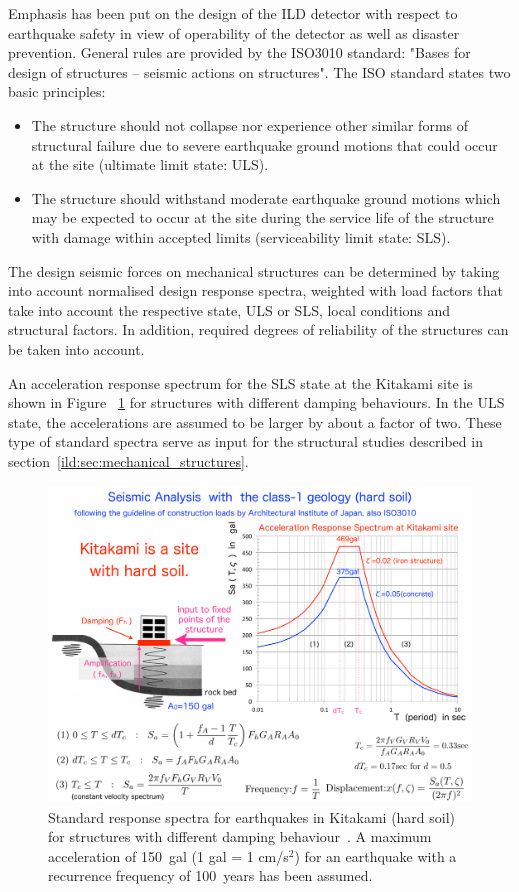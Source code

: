 Emphasis has been put on the design of the ILD detector with respect to earthquake safety in view of operability of the detector as well as disaster prevention. General rules are provided by the ISO3010 standard: "Bases for design of structures -- seismic actions on structures". The ISO standard states two basic principles:
\begin{itemize}
\item The structure should not collapse nor experience other similar forms of structural failure due to severe earthquake ground motions that could occur at the site (ultimate limit state: ULS).
\item The structure should withstand moderate earthquake ground motions which may be expected to occur at the site during the service life of the structure with damage within accepted limits (serviceability limit state: SLS).
\end{itemize}

The design seismic forces on mechanical structures can be determined by taking into account normalised design response spectra, weighted with load factors that take into account the respective state, ULS or SLS, local conditions and structural factors. In addition, required degrees of reliability of the structures can be taken into account.

An acceleration response spectrum for the SLS state at the Kitakami site is shown in Figure~ \ref{ild:fig:integration:earthquake_spectra} for structures with different damping behaviours. In the ULS state, the accelerations are assumed to be larger by about a factor of two. These type of standard spectra serve as input for the structural studies described in section~\ref{ild:sec:mechanical_structures}.
\begin{figure}[t!]
\begin{center}
\includegraphics[width=0.8\hsize]{Integration/fig/earthquake_spectra.pdf}
\end{center}
\caption{\label{ild:fig:integration:earthquake_spectra}Standard response spectra for earthquakes in Kitakami (hard soil) for structures with different damping behaviour~\cite{ild:bib:earthquake}. A maximum acceleration of 150~gal (1 gal = 1 cm/s$^2$) for an earthquake with a recurrence frequency of 100~years has been assumed.}
\end{figure}


